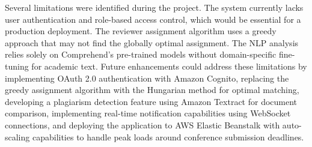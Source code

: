 \documentclass[conference]{IEEEtran}
\begin{document}
Several limitations were identified during the project. The system currently lacks user authentication and role-based access control, which would be essential for a production deployment. The reviewer assignment algorithm uses a greedy approach that may not find the globally optimal assignment. The NLP analysis relies solely on Comprehend's pre-trained models without domain-specific fine-tuning for academic text. Future enhancements could address these limitations by implementing OAuth 2.0 authentication with Amazon Cognito, replacing the greedy assignment algorithm with the Hungarian method for optimal matching, developing a plagiarism detection feature using Amazon Textract for document comparison, implementing real-time notification capabilities using WebSocket connections, and deploying the application to AWS Elastic Beanstalk with auto-scaling capabilities to handle peak loads around conference submission deadlines.
\end{document}
